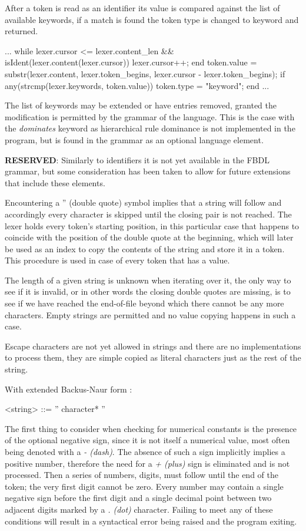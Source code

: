 After a token is read as an identifier its value is compared against the list of available keywords, if a match is found the token type is changed to keyword and returned.

\begin{octave}
...
while lexer.cursor <= lexer.content_len &&
		isIdent(lexer.content(lexer.cursor))
  lexer.cursor++;
end
token.value = substr(lexer.content, lexer.token_begins,
		lexer.cursor - lexer.token_begins);
if any(strcmp(lexer.keywords, token.value))
  token.type = "keyword";
end
...
\end{octave}

The list of keywords may be extended or have entries removed, granted the modification is permitted by the grammar of the language. This is the case with the \textit{dominates} keyword as hierarchical rule dominance is not implemented in the program, but is found in the grammar as an optional language element.

\textbf{RESERVED}: Similarly to identifiers it is not yet available in the FBDL grammar, but some consideration has been taken to allow for future extensions that include these elements.

Encountering a '' (double quote) symbol implies that a string will follow and accordingly every character is skipped until the closing pair is not reached. The lexer holds every token's starting position, in this particular case that happens to coincide with the position of the double quote at the beginning, which will later be used as an index to copy the contents of the string and store it in a token. This procedure is used in case of every token that has a value.

The length of a given string is unknown when iterating over it, the only way to see if it is invalid, or in other words the closing double quotes are missing, is to see if we have reached the end-of-file beyond which there cannot be any more characters. Empty strings are permitted and no value copying happens in such a case.

Escape characters are not yet allowed in strings and there are no implementations to process them, they are simple copied as literal characters just as the rest of the string.

With extended Backus-Naur form :
\begin{grammar}
<string> ::= '' character* ''
\end{grammar}

The first thing to consider when checking for numerical constants is the presence of the optional negative sign, since it is not itself a numerical value, most often being denoted with a \textit{- (dash)}. The absence of such a sign implicitly implies a positive number, therefore the need for a \textit{+ (plus)} sign is eliminated and is not processed. Then a series of numbers, digits, must follow until the end of the token; the very first digit cannot be zero. Every number may contain a single negative sign before the first digit and a single decimal point between two adjacent digits marked by a \textit{. (dot)} character. Failing to meet any of these conditions will result in a syntactical error being raised and the program exiting.

